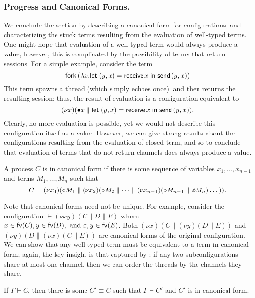 \documentclass[oribibl,orivec,envcountsame]{llncs}
\begin{document}
\subsubsection{Progress and Canonical Forms.}

We conclude the section by describing a canonical form for configurations, and characterizing the
stuck terms resulting from the evaluation of well-typed terms.  One might hope that evaluation of a
well-typed term would always produce a value; however, this is complicated by the possibility of
terms that return sessions.  For a simple example, consider the term
%
\[
  \mathsf{fork} \, (\lambda x. \mathsf{let}\;(y,x) = \mathsf{receive} \, x\;\mathsf{in}\;\mathsf{send} \, (y,x))
\]
%
This term spawns a thread (which simply echoes once), and then returns the resulting session; thus,
the result of evaluation is a configuration equivalent to
\[
  (\nu x)({\mathord{\bullet}} x \parallel \mathsf{let}\;(y,x) = \mathsf{receive} \, x\;\mathsf{in}\;\mathsf{send} \, (y,x)).
\]
Clearly, no more evaluation is possible, yet we would not describe this configuration itself as a
value.  However, we can give strong results about the configurations resulting from the evaluation
of closed term, and so to conclude that evaluation of terms that do not return channels does always
produce a value.

\begin{definition}
A process $C$ is in canonical form if there is some sequence of variables $x_1,\dots,x_{n-1}$ and
terms $M_1,\dots,M_n$ such that
\[
  C = (\nu x_1)({\mathord{\circ}} M_1 \parallel (\nu x_2)({\mathord{\circ}} M_2 \parallel \dots \parallel (\nu x_{n-1})({\mathord{\circ}} M_{n-1} \parallel \phi M_n)\dots)).
\]
\end{definition}

Note that canonical forms need not be unique.  For example, consider the configuration $\vdash (\nu
xy)(C \parallel D \parallel E)$ where $x \in \mathsf{fv}(C), y \in \mathsf{fv}(D), \text{ and } x,y \in \mathsf{fv}(E)$.
Both $(\nu x)(C \parallel (\nu y)(D \parallel E))$ and $(\nu y)(D \parallel (\nu x)(C \parallel E))$
are canonical forms of the original configuration.  We can show that any well-typed term must be
equivalent to a term in canonical form; again, the key insight is that captured by
: if any two subconfigurations share at most one channel, then we
can order the threads by the channels they share.

\begin{lemma}\label{thm:canonical}
  If $\Gamma \vdash C$, then there is some $C' \equiv C$ such that $\Gamma \vdash C'$ and $C'$ is in
  canonical form.
\end{lemma}
\end{document}
